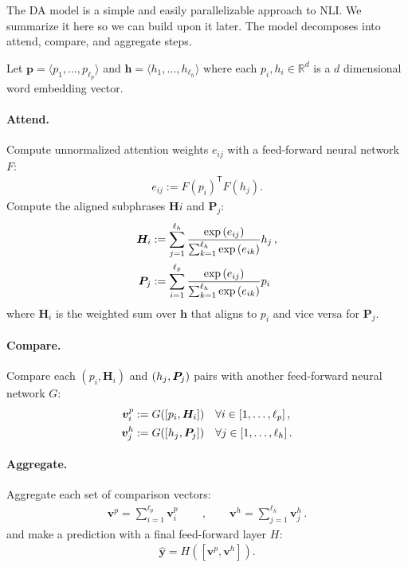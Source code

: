 \documentclass[11pt,a4paper]{article}
\begin{document}
The DA model is a simple and easily parallelizable approach to NLI.
We summarize it here so we can build upon it later.
The model
decomposes into attend, compare, and aggregate steps.

Let
$\bm{p} = \langle p_1, \dots, p_{\ell_p} \rangle$ and
$\bm{h} = \langle h_1, \dots, h_{\ell_h} \rangle$ where each $p_i, h_i \in \mathbb{R}^d$
is a $d$ dimensional word embedding vector.

\paragraph{Attend.} Compute unnormalized attention weights $e_{ij}$ with
a feed-forward neural network $F$:
\begin{align}\label{eq:attend}
    e_{ij} := F(p_i)^\mathsf{T} F(h_j).
\end{align}
Compute the aligned subphrases $\bm{H}i$ and $\bm{P}_j$:
\begin{align}
    \bm{H}_i &:= \sum_{j=1}^{\ell_h}\frac{\exp{(e_{ij})}}
                                        {\sum_{k=1}^{\ell_h}\exp{(e_{ik})}}h_j\,, \notag \\
    \bm{P}_j &:= \sum_{i=1}^{\ell_p}\frac{\exp{(e_{ij})}}
                                        {\sum_{k=1}^{\ell_h}\exp{(e_{ik})}}p_i\
\end{align}
where $\bm{H}_i$ is the weighted sum over $\bm{h}$ that aligns to $p_i$ and vice versa
for $\bm{P}_j$.

\paragraph{Compare.} Compare each $(p_i, \bm{H}_i)$ and $(h_j, \bm{P_}j)$ pairs
with another feed-forward neural network $G$:
\begin{align}
    \bm{v}^p_i &:= G([p_i, \bm{H}_i])\quad \forall i \in [1,\ldots, \ell_p]\,, \notag \\
    \bm{v}^h_j &:= G([h_j, \bm{P}_j])\quad \forall j \in [1,\ldots, \ell_h]\,.
\end{align}

\paragraph{Aggregate.} Aggregate each set of comparison vectors:
\begin{align}
\bm{v}^p = \sum_{i=1}^{\ell_p} \bm{v}^p_i \qquad\,, \qquad
\bm{v}^h = \sum_{j=1}^{\ell_h}  \bm{v}^h_j\,.
\end{align}
and make a prediction with a final feed-forward layer $H$:
\begin{align}\label{eq:predict}
    \hat{\bm{y}} = H([\bm{v}^p, \bm{v}^h]).
\end{align}
\end{document}
